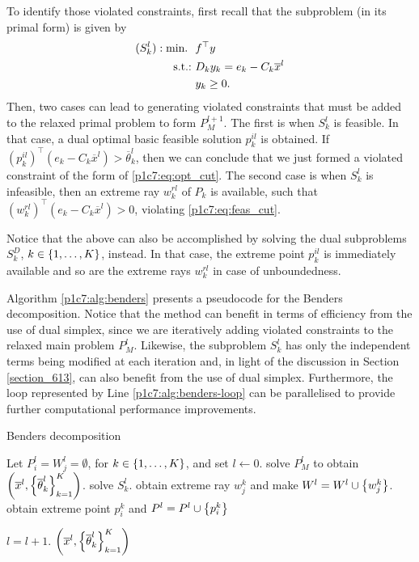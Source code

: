 To identify those violated constraints, first recall that the subproblem (in its primal form) is given by
%
\begin{align*}
	(S_k^l): \mathop{\text{min.~}} \ & f^\top y \\
	\mathop{\text{s.t.:~}} & D_k y_k = e_k - C_k \overline{x}^l \\
	& y_k \geq 0.
\end{align*}
%
Then, two cases can lead to generating violated constraints that must be added to the relaxed primal problem to form $P_M^{l+1}$. The first is when $S_k^l$ is feasible. In that case, a dual optimal basic feasible solution $p^{il}_{k}$ is obtained. If $(p^{il}_k)^\top(e_k - C_k \overline{x}^l) > \overline{\theta}_k^l$, then we can conclude that we just formed a violated constraint of the form of \eqref{p1c7:eq:opt_cut}. The second case is when $S_k^l$ is infeasible, then an extreme ray $w^{rl}_k$ of $P_k$ is available, such that $(w^{rl}_k)^\top(e_k - C_k \overline{x}^l) > 0$, violating \eqref{p1c7:eq:feas_cut}. 

Notice that the above can also be accomplished by solving the dual subproblems $S^D_k$, $k \in \left\{ 1, \dots, K \right \}$, instead. In that case, the extreme point $p^{il}_k$ is immediately available and so are the extreme rays $w^{rl}_k$ in case of unboundedness.

Algorithm \ref{p1c7:alg:benders} presents a pseudocode for the Benders decomposition. Notice that the method can benefit in terms of efficiency from the use of dual simplex, since we are iteratively adding violated constraints to the relaxed main problem $P_M^l$. Likewise, the subproblem $S_k^l$ has only the independent terms being modified at each iteration and, in light of the discussion in Section \ref{section_613}, can also benefit from the use of dual simplex. Furthermore, the loop represented by Line \ref{p1c7:alg:benders-loop} can be parallelised to provide further computational performance improvements. 

\begin{algorithm}[H]
    \caption{Benders decomposition} \label{p1c7:alg:benders}
    \begin{algorithmic}[1] %
    Let $P_i^l = W_j^l = \emptyset$, for $k \in \left\{ 1,\dots,K \right \}$, and set
    $l \gets 0$. 
    \Repeat 
        \State solve $P_M^l$ to obtain $\left(\overline{x}^l, \left\{ \overline{\theta}_k^l \right \}_{k=1}^K\right)$. 
         \label{p1c7:alg:benders-loop}
            \State solve $S_k^l$.
            	\State obtain extreme ray $w_j^k$ and make $W^l = W^l \cup \left\{ w_j^k \right \}$.
            \Else
            	\State obtain extreme point $p_i^k$ and $P^l = P^l \cup \left\{ p_i^k \right \}$
            \EndIf  
        \EndFor
 
        \State $l = l + 1$.        	
     $\left(\overline{x}^l, \left\{ \overline{\theta}_k^l \right \}_{k=1}^K\right)$
  \end{algorithmic}
\end{algorithm}

